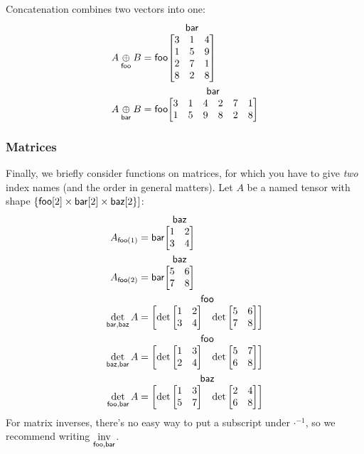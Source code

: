 \documentclass{article}
\makeatletter
\newcommand{\nmatrix}[3]{\name{#1}\begin{array}[b]{@{}c@{}}\name{#2}\\\begin{bmatrix}#3\end{bmatrix}\end{array}}
\makeatother
\begin{document}
Concatenation combines two vectors into one:
\begin{align*}
  A \ncat{foo} B &= \nmatrix{foo}{bar}{
    3 & 1 & 4 \\
    1 & 5 & 9 \\
    2 & 7 & 1 \\
    8 & 2 & 8
  } \\
  A \ncat{bar} B &= \nmatrix{foo}{bar}{
    3 & 1 & 4 & 2 & 7 & 1 \\
    1 & 5 & 9 & 8 & 2 & 8
  }
\end{align*}

\subsubsection{Matrices}

Finally, we briefly consider functions on matrices, for which you have to give \emph{two} index names (and the order in general matters). Let $A$ be a named tensor with shape $\{\nset{foo}{2} \times\nset{bar}{2} \times\nset{baz}{2\}}$:
\begin{align*}
A_{\nidx{foo}{1}} &= \nmatrix{bar}{baz}{
  1 & 2 \\
  3 & 4
} \\
A_{\nidx{foo}{2}} &= \nmatrix{bar}{baz}{
  5 & 6 \\
  7 & 8
} \\
\nfun{bar,baz}{det} A &= \nmatrix{}{foo}{\det \begin{bmatrix} 1 & 2 \\ 3 & 4 \end{bmatrix} & \det \begin{bmatrix} 5 & 6 \\ 7 & 8 \end{bmatrix}} \\
\nfun{baz,bar}{det} A &= \nmatrix{}{foo}{\det \begin{bmatrix} 1 & 3 \\ 2 & 4 \end{bmatrix} & \det \begin{bmatrix} 5 & 7 \\ 6 & 8 \end{bmatrix}} \\
\nfun{foo,bar}{det} A &= \nmatrix{}{baz}{\det \begin{bmatrix} 1 & 3 \\ 5 & 7 \end{bmatrix} & \det \begin{bmatrix} 2 & 4 \\ 6 & 8 \end{bmatrix}}
\end{align*}
For matrix inverses, there's no easy way to put a subscript under $\mathord\cdot^{-1}$, so we recommend writing $\nfun{foo,bar}{inv}$.
\end{document}
